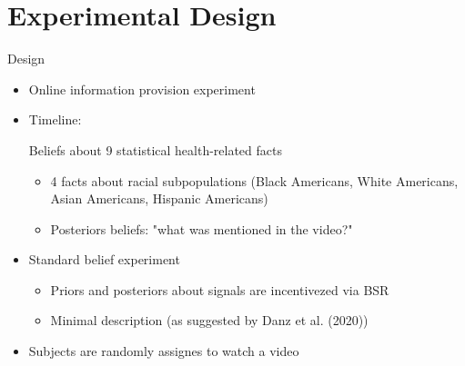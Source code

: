 \documentclass[10pt]{beamer}
\begin{document}
\section{Experimental Design}

\begin{frame}[fragile]{Design}
    \begin{itemize}
		\item Online information provision experiment
            \item Timeline:
            	
	    \begin{center}
\end{center} 

            \items Beliefs about 9 statistical health-related facts
                    \begin{itemize}
                    \item 4 facts about racial subpopulations (Black Americans, White Americans, Asian Americans, Hispanic Americans)
                    \item Posteriors beliefs: "what was \alert{mentioned} in the video?"
                    \end{itemize}

		\item Standard belief experiment
		\begin{itemize}
		    \item Priors and posteriors about signals are incentivezed via BSR  
		    \item Minimal description (as suggested by Danz et al. (2020))
		\end{itemize}
		\item Subjects are randomly assignes to watch a video
		
	\end{itemize}


\end{frame}
\end{document}
